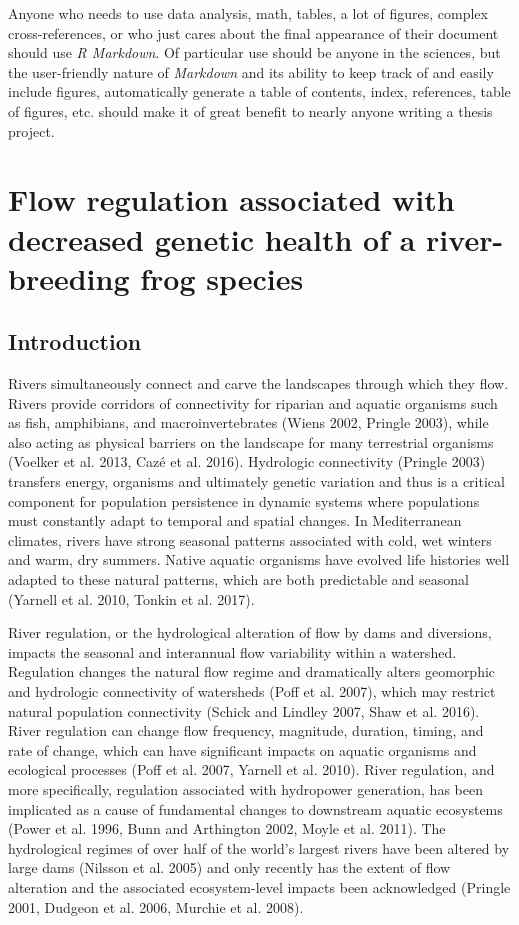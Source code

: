 \documentclass[twoside,12pt,final]{ucthesis-CA2012}
\begin{document}
\begin{ucmainmatter}
Anyone who needs to use data analysis, math, tables, a lot of figures,
complex cross-references, or who just cares about the final appearance
of their document should use \emph{R Markdown}. Of particular use should
be anyone in the sciences, but the user-friendly nature of
\emph{Markdown} and its ability to keep track of and easily include
figures, automatically generate a table of contents, index, references,
table of figures, etc. should make it of great benefit to nearly anyone
writing a thesis project.

\hypertarget{reg-health}{%
\chapter{Flow regulation associated with decreased genetic health of a
river-breeding frog species}\label{reg-health}}

\hypertarget{introduction-1}{%
\section{Introduction}\label{introduction-1}}

Rivers simultaneously connect and carve the landscapes through which
they flow. Rivers provide corridors of connectivity for riparian and
aquatic organisms such as fish, amphibians, and macroinvertebrates
(Wiens 2002, Pringle 2003), while also acting as physical barriers on
the landscape for many terrestrial organisms (Voelker et al. 2013, Cazé
et al. 2016). Hydrologic connectivity (Pringle 2003) transfers energy,
organisms and ultimately genetic variation and thus is a critical
component for population persistence in dynamic systems where
populations must constantly adapt to temporal and spatial changes. In
Mediterranean climates, rivers have strong seasonal patterns associated
with cold, wet winters and warm, dry summers. Native aquatic organisms
have evolved life histories well adapted to these natural patterns,
which are both predictable and seasonal (Yarnell et al. 2010, Tonkin et
al. 2017).

River regulation, or the hydrological alteration of flow by dams and
diversions, impacts the seasonal and interannual flow variability within
a watershed. Regulation changes the natural flow regime and dramatically
alters geomorphic and hydrologic connectivity of watersheds (Poff et al.
2007), which may restrict natural population connectivity (Schick and
Lindley 2007, Shaw et al. 2016). River regulation can change flow
frequency, magnitude, duration, timing, and rate of change, which can
have significant impacts on aquatic organisms and ecological processes
(Poff et al. 2007, Yarnell et al. 2010). River regulation, and more
specifically, regulation associated with hydropower generation, has been
implicated as a cause of fundamental changes to downstream aquatic
ecosystems (Power et al. 1996, Bunn and Arthington 2002, Moyle et al.
2011). The hydrological regimes of over half of the world's largest
rivers have been altered by large dams (Nilsson et al. 2005) and only
recently has the extent of flow alteration and the associated
ecosystem-level impacts been acknowledged (Pringle 2001, Dudgeon et al.
2006, Murchie et al. 2008).


\end{ucmainmatter}
\end{document}
